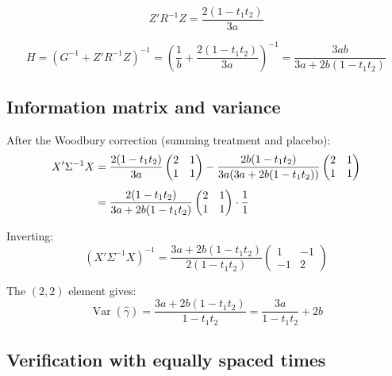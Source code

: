 \documentclass[11pt]{article}
\DeclareMathOperator{\Var}{Var}
\begin{document}
\begin{equation}
  Z'R^{-1}Z = \frac{2(1 - t_1 t_2)}{3a}
\end{equation}

\begin{equation}
  H = (G^{-1} + Z'R^{-1}Z)^{-1}
  = \left(\frac{1}{b}
    + \frac{2(1 - t_1 t_2)}{3a}\right)^{-1}
  = \frac{3ab}{3a + 2b(1 - t_1 t_2)}
  \label{eq:H_general}
\end{equation}


\subsection{Information matrix and variance}

After the Woodbury correction (summing treatment and
placebo):
\begin{align}
  X'\Sigma^{-1}X
  &= \frac{2(1 - t_1 t_2)}{3a}
    \begin{pmatrix} 2 & 1 \\ 1 & 1 \end{pmatrix}
    - \frac{2b(1-t_1 t_2)}{3a(3a + 2b(1-t_1 t_2))}
    \begin{pmatrix} 2 & 1 \\ 1 & 1 \end{pmatrix}
    \notag \\[4pt]
  &= \frac{2(1-t_1 t_2)}{3a + 2b(1-t_1 t_2)}
    \begin{pmatrix} 2 & 1 \\ 1 & 1 \end{pmatrix}
    \cdot \frac{1}{1}
\end{align}

Inverting:
\begin{equation}
  (X'\Sigma^{-1}X)^{-1}
  = \frac{3a + 2b(1 - t_1 t_2)}{2(1 - t_1 t_2)}
    \begin{pmatrix} 1 & -1 \\ -1 & 2 \end{pmatrix}
\end{equation}

The $(2,2)$ element gives:
\begin{equation}
  \boxed{
    \Var(\hat\gamma)
    = \frac{3a + 2b(1 - t_1 t_2)}{1 - t_1 t_2}
    = \frac{3a}{1 - t_1 t_2} + 2b
  }
  \label{eq:var_general}
\end{equation}


\subsection{Verification with equally spaced times}
\end{document}
